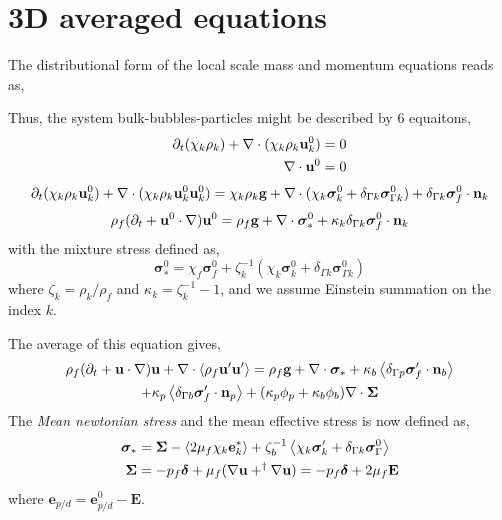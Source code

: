 \section{3D averaged equations}

The distributional form of the local scale mass and momentum equations reads as, 

Thus, the system bulk-bubbles-particles might be described by 6 equaitons, 
\begin{align}
    \partial_t (\chi_k \rho_k)
    + \mathbf{\nabla}\cdot (\chi_k \rho_k \textbf{u}_k^0)
    &= 
    0\\
    \mathbf{\nabla}\cdot \textbf{u}^0
    &= 
    0
\end{align}
\begin{equation}
    \partial_t (\chi_k \rho_k \textbf{u}^0_k)
    + \mathbf{\nabla}\cdot (
        \chi_k \rho_k \textbf{u}^0_k \textbf{u}_k^0
        )
    = 
    \chi_k \rho_k \textbf{g}
    + \mathbf{\nabla}\cdot (\chi_k \bm\sigma_k^0  + \delta_{\Gamma k} \bm\sigma_{\Gamma k}^0 )
    + \delta_{\Gamma k}  \bm\sigma_f^0 \cdot \textbf{n}_k
\end{equation}
\begin{equation}
    \rho_f (\partial_t + \textbf{u}^0 \cdot \mathbf{\nabla})\textbf{u}^0
    = 
    \rho_f \textbf{g}
    + \mathbf{\nabla}\cdot \bm\sigma^0_*
    +\kappa_k  \delta_{\Gamma k}  \bm\sigma_f^0 \cdot \textbf{n}_k 
\end{equation}
with the mixture stress defined as, 
\begin{equation}
    \bm\sigma^0_*
    =
    \chi_f \bm\sigma_f^0  
    +\zeta_k^{-1} (\chi_k \bm\sigma_k^0 + \delta_{\Gamma k} \bm\sigma_{\Gamma k}^0)  
\end{equation}
where $\zeta_k = \rho_k/\rho_f$ and  $ \kappa_k  = \zeta^{-1}_k - 1 $, and we assume Einstein summation on the index $k$.


The average of this equation gives, 
\begin{multline}
    \rho_f (\partial_t + \textbf{u} \cdot \mathbf{\nabla})\textbf{u}
    + \mathbf{\nabla}\cdot \left<\rho_f \textbf{u}' \textbf{u}'\right>
    = 
    \rho_f \textbf{g}
    + \mathbf{\nabla}\cdot \bm\sigma_*
    +\kappa_b  \left<\delta_{\Gamma p} \bm\sigma_f' \cdot \textbf{n}_b\right> \\
    +\kappa_p  \left<\delta_{\Gamma b}  \bm\sigma_f' \cdot \textbf{n}_p\right> 
    + (\kappa_p \phi_p + \kappa_b \phi_b)\mathbf{\nabla}\cdot\bm\Sigma
\end{multline}
The \textit{Mean newtonian stress} and the mean effective stress is now defined as, 
\begin{align}
    \bm\sigma_* &= 
    \bm\Sigma 
    - \left<2\mu_f \chi_k \textbf{e}_k^*\right>
    +\zeta_b^{-1} \left<\chi_k \bm\sigma_k' + \delta_{\Gamma k} \bm\sigma_\Gamma^0\right> \\
    \bm\Sigma
    &=
    -p_f\bm\delta
    + \mu_f (\mathbf{\nabla} \textbf{u} + ^\dagger\mathbf{\nabla} \textbf{u})
    =
    -p_f\bm\delta
    +2 \mu_f \textbf{E}
\end{align}
where $\textbf{e}_{p/d} = \textbf{e}_{p/d}^0 - \textbf{E}$. 

